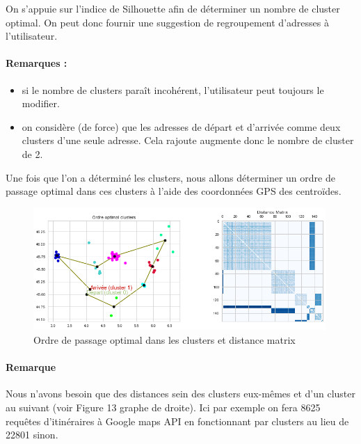 \documentclass[12pt]{article}
\begin{document}
On s'appuie sur l'indice de Silhouette afin de déterminer un nombre de cluster optimal. On peut donc fournir une suggestion de regroupement d'adresses à l'utilisateur.
\newpage
\paragraph{Remarques :}
\begin{itemize}
\item si le nombre de clusters paraît incohérent, l'utilisateur peut toujours le modifier.
\item on considère (de force) que les adresses de départ et d'arrivée comme deux clusters d'une seule adresse. Cela rajoute augmente donc le nombre de cluster de 2.\\
\end{itemize}


Une fois que l'on a déterminé les clusters, nous allons déterminer un ordre de passage optimal dans ces clusters à l'aide des coordonnées GPS des centroïdes.

\begin{figure}[H]
\caption{Ordre de passage optimal dans les clusters et distance matrix}
\begin{center}
\includegraphics[width=0.99\textwidth]{ARA_ordre_clusters_distance_matrix}
\end{center}
\end{figure}

\paragraph{Remarque} Nous n'avons besoin que des distances sein des clusters eux-mêmes et d'un cluster au suivant (voir Figure 13 graphe de droite). Ici par exemple on fera 8625 requêtes d'itinéraires à Google maps API en fonctionnant par clusters au lieu de 22801 sinon.\\ 
\end{document}

